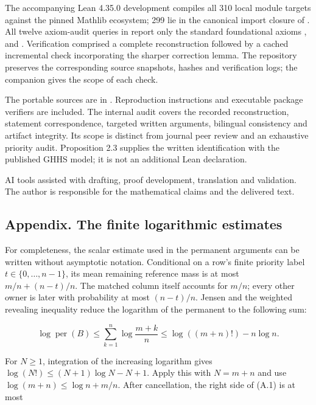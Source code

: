 \documentclass[english,11pt,a4paper]{article}
\begin{document}
The accompanying Lean 4.35.0 development compiles all 310 local module targets against the pinned Mathlib ecosystem; 299 lie in the canonical import closure of . All twelve axiom-audit queries in  report only the standard foundational axioms ,  and . Verification comprised a complete reconstruction followed by a cached incremental check incorporating the sharper correction lemma. The repository preserves the corresponding source snapshots, hashes and verification logs; the companion gives the scope of each check.

The portable sources are in . Reproduction instructions and executable package verifiers are included. The internal audit covers the recorded reconstruction, statement correspondence, targeted written arguments, bilingual consistency and artifact integrity. Its scope is distinct from journal peer review and an exhaustive priority audit. Proposition 2.3 supplies the written identification with the published GHHS model; it is not an additional Lean declaration.

AI tools assisted with drafting, proof development, translation and validation. The author is responsible for the mathematical claims and the delivered text.

\subsection{Appendix. The finite logarithmic estimates}\label{appendix.-the-finite-logarithmic-estimates}

For completeness, the scalar estimate used in the permanent arguments can be written without asymptotic notation. Conditional on a row's finite priority label \(t\in\{0,\ldots,n-1\}\), its mean remaining reference mass is at most \(m/n+(n-t)/n\). The matched column itself accounts for \(m/n\); every other owner is later with probability at most \((n-t)/n\). Jensen and the weighted revealing inequality reduce the logarithm of the permanent to the following sum:

\nopagebreak[4]
\[\log\operatorname{per}(B)\le\sum_{k=1}^n\log\frac{m+k}{n}
\le\log((m+n)!)-n\log n.\tag{A.1}\]

For \(N\ge1\), integration of the increasing logarithm gives \(\log(N!)\le(N+1)\log N-N+1\). Apply this with \(N=m+n\) and use \(\log(m+n)\le\log n+m/n\). After cancellation, the right side of (A.1) is at most
\end{document}
